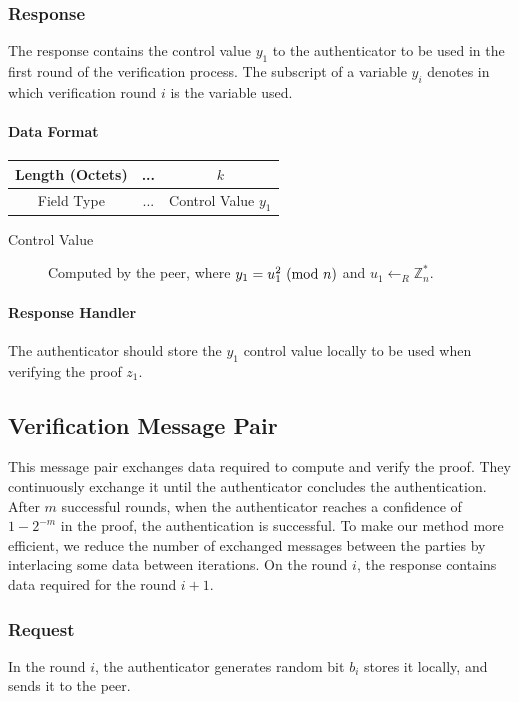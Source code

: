 \subsubsection{Response}
The response contains the control value $y_1$ to the authenticator to be used in the first round of the verification process.
The subscript of a variable $y_i$ denotes in which verification round $i$ is the variable used.

\paragraph{Data Format}

\begin{center}
\begin{tabular}{|c|c|c|}
	\hline
	Length (Octets) & ... & $k$ \\
	\hline
	Field Type & ... & Control Value $y_1$\\
	\hline
\end{tabular}
\end{center}

\bigskip

\begin{description}
	\item[Control Value] Computed by the peer, where $y_1 = u_1^2 \ (\mathrm{mod}\ n)$ and $u_1 \leftarrow_R \mathbb{Z}^*_n$.
\end{description}

\paragraph{Response Handler}
The authenticator should store the $y_1$ control value locally to be used when verifying the proof $z_1$.

\subsection{Verification Message Pair}
This message pair exchanges data required to compute and verify the proof.
They continuously exchange it until the authenticator concludes the authentication.
After $m$ successful rounds, when the authenticator reaches a confidence of $1 - 2^{-m}$ in the proof, the authentication is successful.
To make our method more efficient, we reduce the number of exchanged messages between the parties by interlacing some data between iterations.
On the round $i$, the response contains data required for the round $i+1$.


\subsubsection{Request}
In the round $i$, the authenticator generates random bit $b_i$ stores it locally, and sends it to the peer.
